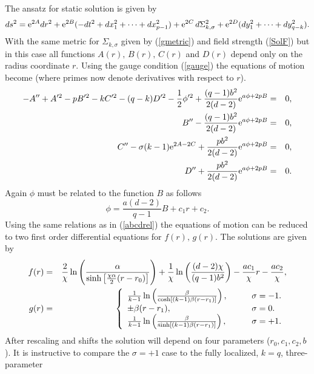 \documentclass[a4paper,aps,nofootinbib,showpacs,preprint]{revtex4}
\begin{document}
The ansatz for static solution is given by
\begin{equation}
ds^2 = {\rm e}^{2A} dr^2 + {\rm e}^{2B} (- dt^2 + dx_1^2 + \cdots
+ dx_{p-1}^2) + {\rm e}^{2C} \, d\Sigma_{k,\sigma}^2 + {\rm
e}^{2D} (dy_1^2 + \cdots + dy_{q-k}^2).
\end{equation}
With the same metric for $\Sigma_{k,\sigma}$ given by
(\ref{gmetric}) and field strength (\ref{SolF}) but in this case
all functions $A(r),\,B(r),\,C(r)$ and $D(r)$ depend only on the
radius coordinate $r$. Using the gauge condition (\ref{gauge})
the equations of motion become (where primes now denote
derivatives with respect to $r$).
\begin{eqnarray}
- A''  + A'^2 - p B'^2 - k C'^2 - (q-k) D'^2 - \frac12 \phi'^2 +
\frac{(q-1)b^2}{2(d-2)} {\rm e}^{a\phi+2pB} &=& 0, \label{EqAd}\\
B'' - \frac{(q-1) b^2}{2(d-2)} {\rm e}^{a\phi+2pB} &=& 0,
\label{EqBd} \\
C'' - \sigma (k-1) {\rm e}^{2A-2C} + \frac{p b^2}{2(d-2)} {\rm
e}^{a\phi+2pB} &=& 0, \label{EqCd} \\
D'' + \frac{p b^2}{2(d-2)} {\rm e}^{a\phi+2pB} &=& 0. \label{EqDd}
\end{eqnarray}
Again $\phi$ must be related to the function $B$ as follows
\begin{equation}\label{SolPhib}
\phi = \frac{a(d-2)}{q-1} B + c_1 r + c_2.
\end{equation}
Using the same relations as in (\ref{abcdrel}) the equations of
motion can be reduced to two first order differential equations
for $f(r),\,g(r)$. The solutions are given by
\begin{eqnarray}
f(r) &=& \frac2{\chi} \ln \left( \frac{\alpha}{\sinh \left[ {\chi
\alpha \over 2}(r-r_0) \right]} \right) + \frac1{\chi} \ln \left(
{ (d-2) \chi \over (q-1) b^2 } \right) - {a c_1 \over
\chi}r - {a c_2\over \chi} , \\
g(r) &=& \left\{ \begin{array}{ll}
 \frac1{k-1}\ln\left(\frac{\beta}{\cosh[(k-1) \beta (r-r_1)
   ]} \right), \qquad & \sigma=-1. \\
 \pm \beta (r-r_1), & \sigma=0. \\
 \frac1{k-1}\ln\left(\frac{\beta}{\sinh[(k-1) \beta (r-r_1)
   ]} \right), & \sigma=+1. \end{array} \right.
\end{eqnarray}
After rescaling and shifts the solution will depend on four
parameters ($r_0,c_1,c_2,b$). It is instructive to compare the
$\sigma=+1$ case to the fully localized, $k=q$, three-parameter
\end{document}
